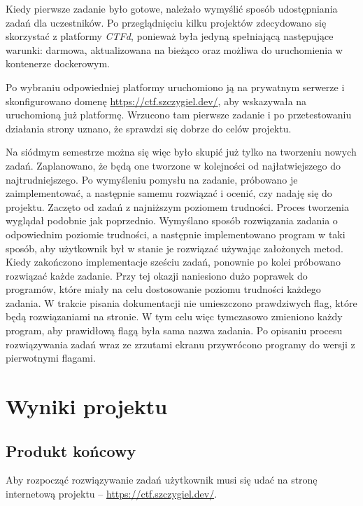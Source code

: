 \documentclass[language=polish,type=eng]{aghmodern}
\begin{document}
Kiedy pierwsze zadanie było gotowe, należało wymyślić sposób udostępniania zadań
dla uczestników. Po przeglądnięciu kilku projektów zdecydowano się skorzystać
z platformy \emph{CTFd}, ponieważ była jedyną spełniającą następujące warunki: darmowa, aktualizowana
na bieżąco oraz możliwa do uruchomienia w kontenerze dockerowym.

Po wybraniu odpowiedniej platformy uruchomiono ją na prywatnym serwerze i skonfigurowano
domenę \url{https://ctf.szczygiel.dev/}, aby wskazywała na uruchomioną już platformę.
Wrzucono tam pierwsze zadanie i po przetestowaniu działania strony uznano, że sprawdzi
się dobrze do celów projektu.

Na siódmym semestrze można się więc było skupić już tylko na tworzeniu
nowych zadań. Zaplanowano, że będą one tworzone w kolejności od najłatwiejszego
do najtrudniejszego. Po wymyśleniu pomysłu na zadanie, próbowano
je zaimplementować, a następnie samemu rozwiązać i ocenić, czy nadaję się do projektu.
Zaczęto od zadań z najniższym poziomem trudności. Proces tworzenia wyglądał
podobnie jak poprzednio. Wymyślano sposób rozwiązania zadania o odpowiednim poziomie
trudności, a następnie implementowano program w taki sposób, aby użytkownik był
w stanie je rozwiązać używając założonych metod.
Kiedy zakończono implementacje sześciu zadań,
ponownie po kolei próbowano rozwiązać każde zadanie.
Przy tej okazji naniesiono dużo poprawek do programów,
które miały na celu dostosowanie poziomu trudności każdego zadania. W trakcie
pisania dokumentacji nie umieszczono prawdziwych flag, które będą rozwiązaniami na stronie.
W tym celu więc tymczasowo zmieniono każdy program, aby prawidłową flagą była
sama nazwa zadania. Po opisaniu procesu rozwiązywania zadań wraz ze zrzutami ekranu
przywrócono programy do wersji z pierwotnymi flagami.

\chapter{Wyniki projektu}

\section{Produkt końcowy}

Aby rozpocząć rozwiązywanie zadań użytkownik musi się udać na stronę internetową
projektu -- \url{https://ctf.szczygiel.dev/}.
\end{document}
